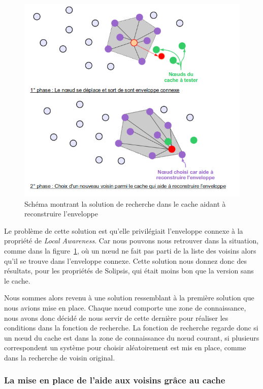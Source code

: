 	\begin{figure}[!h]
        \centering
        \includegraphics[scale=0.45]{./Ressources/Images/cacheReconstructEnvelop.png}
        \caption{Schéma montrant la solution de recherche dans le cache aidant à reconstruire l'enveloppe}
        \label{schemaEnvelopCache}
        \end{figure}
\par Le problème de cette solution est qu'elle privilégiait l'enveloppe connexe à la propriété de \textit{Local Awareness}. Car nous pouvons nous retrouver dans la situation, comme dans la figure~\ref{schemaEnvelopCache}, où un nœud ne fait pas parti de la liste des voisins alors qu'il se trouve dans l'enveloppe connexe. Cette solution nous donnez donc des résultats, pour les propriétés de Solipsis, qui était moins bon que la version sans le cache.  

\par Nous sommes alors revenu à une solution ressemblant à la première solution que nous avions mise en place. Chaque nœud comporte une zone de connaissance, nous avons donc décidé de nous servir de cette dernière pour réaliser les conditions dans la fonction de recherche. La fonction de recherche regarde donc si un nœud du cache est dans la zone de connaissance du nœud courant, si plusieurs correspondent un système pour choisir aléatoirement est mis en place, comme dans la recherche de voisin original.


\subsubsection{La mise en place de l'aide aux voisins grâce au cache}

